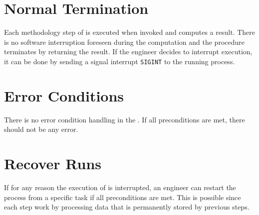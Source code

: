 

\section{Normal Termination}


Each methodology step of \MASS is executed when invoked and computes a result. There is no software interruption foreseen during the computation and the procedure terminates by returning the result.
If the engineer decides to interrupt \MASS execution, it can be done by sending a signal interrupt \texttt{SIGINT} to the running process.

\section{Error Conditions}


There is no error condition handling in the \FAQAS. If all preconditions are met, there should not be any error.

\section{Recover Runs}


If for any reason the execution of \MASS is interrupted, an engineer can restart the process from a specific task if all preconditions are met. This is possible since each \MASS step work by processing data that is permanently stored by previous steps.
